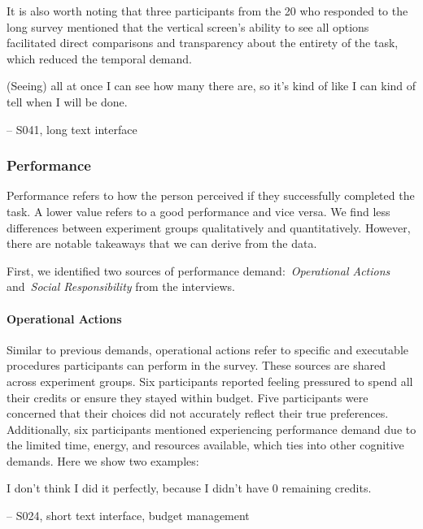 It is also worth noting that three participants from the 20 who responded to the long survey mentioned that the vertical screen's ability to see all options facilitated direct comparisons and transparency about the entirety of the task, which reduced the temporal demand.

\begin{displayquote}
(Seeing) all at once I can see how many there are, so it's kind of like I can kind of tell when I will be done.

\noindent \hfill -- S041, long text interface
\end{displayquote}

\subsubsection{Performance}
Performance refers to how the person perceived if they successfully completed the task. A lower value refers to a good performance and vice versa. We find less differences between experiment groups qualitatively and quantitatively. However, there are notable takeaways that we can derive from the data.

First, we identified two sources of performance demand:~\textit{Operational Actions} and~\textit{Social Responsibility} from the interviews. 

\paragraph{Operational Actions}
Similar to previous demands, operational actions refer to specific and executable procedures participants can perform in the survey. These sources are shared across experiment groups. Six participants reported feeling pressured to spend all their credits or ensure they stayed within budget. Five participants were concerned that their choices did not accurately reflect their true preferences. Additionally, six participants mentioned experiencing performance demand due to the limited time, energy, and resources available, which ties into other cognitive demands. Here we show two examples:

\begin{displayquote}
I don't think I did it perfectly, because I didn't have 0 remaining credits.
    
\noindent \hfill -- S024, short text interface, budget management
\end{displayquote}

